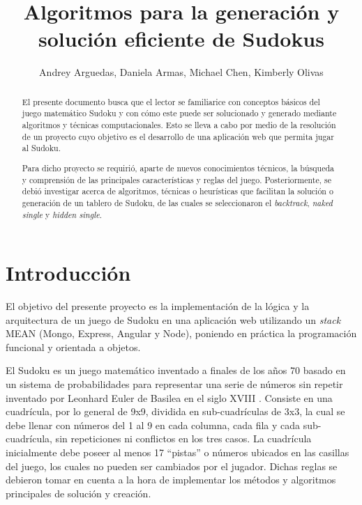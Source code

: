 \documentclass[conference]{IEEEtran}
\begin{document}
\clearpage


\title{Algoritmos para la generación y solución eficiente de Sudokus}
\author{Andrey Arguedas, Daniela Armas, Michael Chen, Kimberly Olivas}
\maketitle

\begin{otherlanguage}{spanish}
\begin{abstract}
El presente documento busca que el lector se familiarice con conceptos básicos del juego matemático Sudoku y con cómo este puede ser solucionado y generado mediante algoritmos y técnicas computacionales. Esto se lleva a cabo por medio de la resolución de un proyecto cuyo objetivo es el desarrollo de una aplicación web que permita jugar al Sudoku.

Para dicho proyecto se requirió, aparte de nuevos conocimientos técnicos, la búsqueda y comprensión de las principales características y reglas del juego. Posteriormente, se debió investigar acerca de algoritmos, técnicas o heurísticas que facilitan la solución o generación de un tablero de Sudoku, de las cuales se seleccionaron el \textit{backtrack}, \textit{naked single} y \textit{hidden single}. 
\end{abstract}
\end{otherlanguage}

\section{Introducción}
El objetivo del presente proyecto es la implementación de la lógica y la arquitectura de un juego de Sudoku en una aplicación web utilizando un \textit{stack} MEAN (Mongo, Express, Angular y Node), poniendo en práctica la programación funcional y orientada a objetos. 

El Sudoku es un juego matemático inventado a finales de los años 70 basado en un sistema de probabilidades para representar una serie de números sin repetir inventado por Leonhard Euler de Basilea en el siglo XVIII \cite{sudokuWiki}. 
Consiste en una cuadrícula, por lo general de 9x9, dividida en sub-cuadrículas de 3x3, la cual se debe llenar con números del 1 al 9 en cada columna, cada fila y cada sub-cuadrícula, sin repeticiones ni conflictos en los tres casos. La cuadrícula inicialmente debe poseer al menos 17 “pistas” o números ubicados en las casillas del juego, los cuales no pueden ser cambiados por el jugador. Dichas reglas se debieron tomar en cuenta a la hora de implementar los métodos y algoritmos principales de solución y creación.
 
\end{document}
